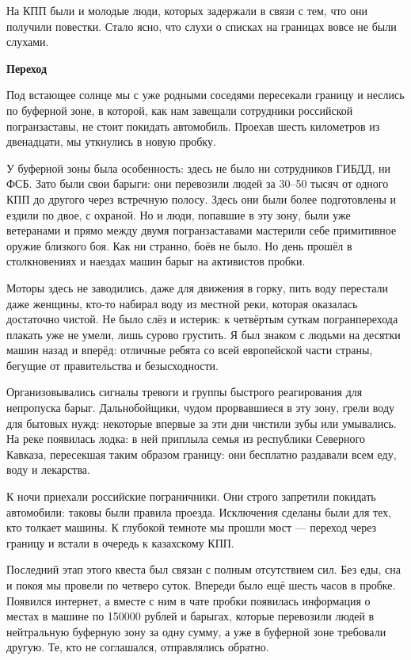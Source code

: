 На КПП были и молодые люди, которых задержали в связи с тем, что они получили повестки. Стало ясно, что слухи о списках на границах вовсе не были слухами.


\textbf{Переход}

Под встающее солнце мы с уже родными соседями пересекали границу и неслись по буферной зоне, в которой, как нам завещали сотрудники российской погранзаставы, не стоит покидать автомобиль. Проехав шесть километров из двенадцати, мы уткнулись в новую пробку.

У буферной зоны была особенность: здесь не было ни сотрудников ГИБДД, ни ФСБ. Зато были свои барыги: они перевозили людей за 30–50 тысяч от одного КПП до другого через встречную полосу. Здесь они были более подготовлены и ездили по двое, с охраной. Но и люди, попавшие в эту зону, были уже ветеранами и прямо между двумя погранзаставами мастерили себе примитивное оружие близкого боя. Как ни странно, боёв не было. Но день прошёл в столкновениях и наездах машин барыг на активистов пробки.

Моторы здесь не заводились, даже для движения в горку, пить воду перестали даже женщины, кто-то набирал воду из местной реки, которая оказалась достаточно чистой. Не было слёз и истерик: к четвёртым суткам погранперехода плакать уже не умели, лишь сурово грустить. Я был знаком с людьми на десятки машин назад и вперёд: отличные ребята со всей европейской части страны, бегущие от правительства и безысходности.

Организовывались сигналы тревоги и группы быстрого реагирования для непропуска барыг. Дальнобойщики, чудом прорвавшиеся в эту зону, грели воду для бытовых нужд: некоторые впервые за эти дни чистили зубы или умывались. На реке появилась лодка: в ней приплыла семья из республики Северного Кавказа, пересекшая таким образом границу: они бесплатно раздавали всем еду, воду и лекарства.

К ночи приехали российские пограничники. Они строго запретили покидать автомобили: таковы были правила проезда. Исключения сделаны были для тех, кто толкает машины. К глубокой темноте мы прошли мост — переход через границу и встали в очередь к казахскому КПП.

Последний этап этого квеста был связан с полным отсутствием сил. Без еды, сна и покоя мы провели по четверо суток. Впереди было ещё шесть часов в пробке. Появился интернет, а вместе с ним в чате пробки появилась информация о местах в машине по 150000 рублей и барыгах, которые перевозили людей в нейтральную буферную зону за одну сумму, а уже в буферной зоне требовали другую. Те, кто не соглашался, отправлялись обратно.

